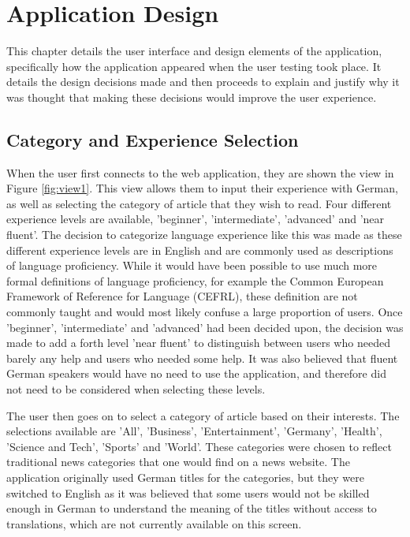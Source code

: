 \chapter{Application Design}

This chapter details the user interface and design elements of the application, specifically how the application appeared when the user testing took place. It details the design decisions made and then proceeds to explain and justify why it was thought that making these decisions would improve the user experience.

\section{Category and Experience Selection}

When the user first connects to the web application, they are shown the view in Figure \ref{fig:view1}. This view allows them to input their experience with German, as well as selecting the category of article that they wish to read. Four different experience levels are available, 'beginner', 'intermediate', 'advanced' and 'near fluent'. The decision to categorize language experience like this was made as these different experience levels are in English and are commonly used as descriptions of language proficiency. While it would have been possible to use much more formal definitions of language proficiency, for example the Common European Framework of Reference for Language (CEFRL), these definition are not commonly taught and would most likely confuse a large proportion of users. Once 'beginner', 'intermediate' and 'advanced' had been decided upon, the decision was made to add a forth level 'near fluent' to distinguish between users who needed barely any help and users who needed some help. It was also believed that fluent German speakers would have no need to use the application, and therefore did not need to be considered when selecting these levels.



The user then goes on to select a category of article based on their interests. The selections available are 'All', 'Business', 'Entertainment', 'Germany', 'Health', 'Science and Tech', 'Sports' and 'World'. These categories were chosen to reflect traditional news categories that one would find on a news website. The application originally used German titles for the categories, but they were switched to English as it was believed that some users would not be skilled enough in German to understand the meaning of the titles without access to translations, which are not currently available on this screen. 

